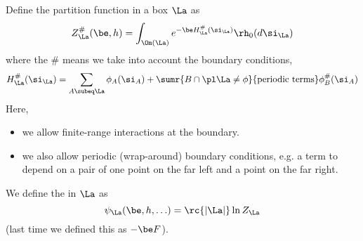 Define the partition function in a box $\La$ as 
\[
Z_{\La}^{\#}(\be,h) = \int_{\Om(\La)} e^{-\be H^{\#}_\La(\si_\La)}\rh_0(d\si_\La)
\]
where the $\#$ means we take into account the boundary conditions,
\[
H_{\La}^{\#}(\si_\La) = \sum_{A\subeq \La} \phi_A(\si_A) + \sumr{B\cap \pl \La\ne \phi}{\text{periodic terms}} \phi^{\#}_B(\si_A)
\]
Here, 
\begin{itemize}
\item
we allow finite-range interactions at the boundary. 
\item
we also allow periodic (wrap-around) boundary conditions, e.g. a term to depend on a pair of one point on the far left and a point on the far right.
\end{itemize}
We define the  in $\La$ as
\[
\psi_{\La}(\be, h,\ldots) = \rc{|\La|}\ln Z_{\La}
\]
(last time we defined this as $-\be F$).

